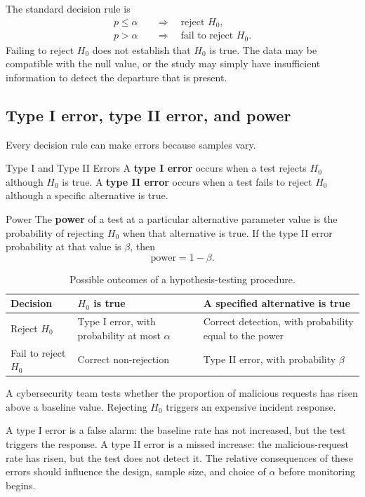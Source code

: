 The standard decision rule is
\[
\begin{aligned}
p\leq\alpha
&\quad\Longrightarrow\quad \text{reject }H_0,\\
p>\alpha
&\quad\Longrightarrow\quad \text{fail to reject }H_0.
\end{aligned}
\]
Failing to reject $H_0$ does not establish that $H_0$ is true. The data may be compatible with the null value, or the study may simply have insufficient information to detect the departure that is present.

\subsection{Type I error, type II error, and power}

Every decision rule can make errors because samples vary.

\begin{definition}{Type I and Type II Errors}
A \textbf{type I error} occurs when a test rejects $H_0$ although $H_0$ is true. A \textbf{type II error} occurs when a test fails to reject $H_0$ although a specific alternative is true.
\end{definition}

\begin{definition}{Power}
The \textbf{power} of a test at a particular alternative parameter value is the probability of rejecting $H_0$ when that alternative is true. If the type II error probability at that value is $\beta$, then
\[
\text{power}=1-\beta.
\]
\end{definition}

\begin{table}[htbp]
\centering
\caption{Possible outcomes of a hypothesis-testing procedure.}
\label{tab:test-decision-errors}
\begin{tabularx}{\textwidth}{@{}l>{\raggedright\arraybackslash}X>{\raggedright\arraybackslash}X@{}}
\toprule
Decision & $H_0$ is true & A specified alternative is true \\
\midrule
Reject $H_0$ & Type I error, with probability at most $\alpha$ & Correct detection, with probability equal to the power \\
Fail to reject $H_0$ & Correct non-rejection & Type II error, with probability $\beta$ \\
\bottomrule
\end{tabularx}
\end{table}

\begin{example}\par
A cybersecurity team tests whether the proportion of malicious requests has risen above a baseline value. Rejecting $H_0$ triggers an expensive incident response.

A type I error is a false alarm: the baseline rate has not increased, but the test triggers the response. A type II error is a missed increase: the malicious-request rate has risen, but the test does not detect it. The relative consequences of these errors should influence the design, sample size, and choice of $\alpha$ before monitoring begins.
\end{example}

